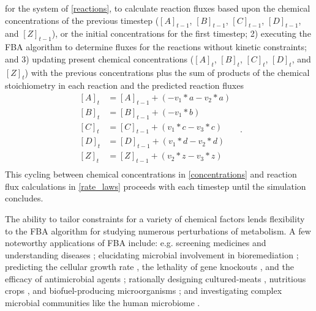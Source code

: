 for the system of \cref{reactions}, to calculate reaction fluxes based upon the chemical concentrations of the previous timestep ($[A]_{t-1}$, $[B]_{t-1}$, $[C]_{t-1}$, $[D]_{t-1}$, and $[Z]_{t-1}$), or the initial concentrations for the first timestep; 2) executing the FBA algorithm to determine fluxes for the reactions without kinetic constraints; and 3) updating present chemical concentrations ($[A]_t$, $[B]_t$, $[C]_t$, $[D]_t$, and $[Z]_t$) with the previous concentrations plus the sum of products of the chemical stoichiometry in each reaction and the predicted reaction fluxes
\begin{equation} \label{concentrations}
    \begin{split}
        [A]_t &= [A]_{t-1} +(- v_1*a - v_2*a)\\
        [B]_t &= [B]_{t-1} +(- v_1*b)\\
        [C]_t &= [C]_{t-1} + (v_1*c - v_3*c)\\
        [D]_t &= [D]_{t-1} + (v_1*d - v_2*d)\\
        [Z]_t &= [Z]_{t-1} + (v_2*z - v_3*z)\\
    \end{split}~~~.
\end{equation}
This cycling between chemical concentrations in \cref{concentrations} and reaction flux calculations in \cref{rate_laws} proceeds with each timestep until the simulation concludes. 

The ability to tailor constraints for a variety of chemical factors lends flexibility to the FBA algorithm for studying numerous perturbations of metabolism. A few noteworthy applications of FBA include: e.g. screening medicines and understanding diseases \cite{Chowdhury2020LeveragingApplications}; elucidating microbial involvement in bioremediation \cite{Rubinstein2021ORTCodes}; predicting the cellular growth rate \cite{Kauffman2003AdvancesAnalysis}, the lethality of gene knockouts \cite{Covert2008IntegratingColi}, and the efficacy of antimicrobial agents \cite{Lee2006FluxMetabolomics}; rationally designing cultured-meats \cite{Suthers2020ChallengesModeling}, nutritious crops \cite{Schwender2008MetabolicPlants, Allen2009MetabolicComplexity, Potrykus2001GoldenAward, Tang2009GoldenA}, and biofuel-producing microorganisms \cite{Pham2021Genome-scaleProduction}; and investigating complex microbial communities \cite{Zomorrodi2012OptCom:Communities, Khandelwal2013CommunityGrowth} like the human microbiome \cite{Shoaie2015QuantifyingMicrobiome, Kumar2019ModellingMicrobiome}.

